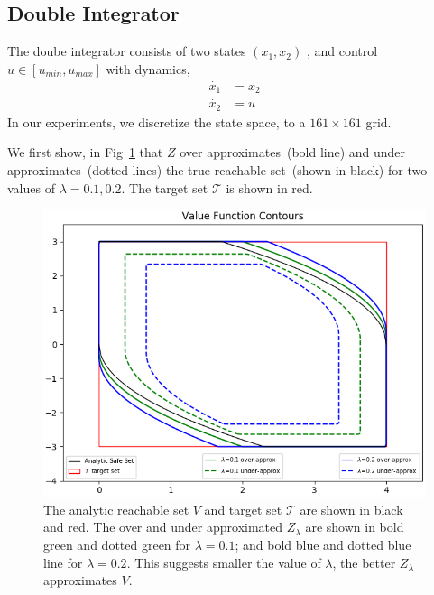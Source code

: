 \subsection{Double Integrator}
The doube integrator consists of two states $(x_1, x_2)$ , and  control $u \in [u_{min}, u_{max}]$ with dynamics,
\begin{equation}
\begin{split}
\dot{x_1} & = x_2 \\
\dot{x_2} & = u 
\end{split}
\end{equation}
In our experiments, we discretize the state space, to a $161 \times 161$ grid.

We first show, in Fig~\ref{fig:convergence} that $Z$ over approximates~(bold line) and under approximates~(dotted lines) the true reachable set~(shown in black) for two values of $\lambda = 0.1, 0.2$. The target set $\mathcal{T}$ is shown in red. 
\begin{figure}
\includegraphics[scale=0.5]{convergence_difflambda.png}
\caption{The analytic reachable set $V$ and target set $\mathcal{T}$ are shown in black and red. The over and under approximated $Z_{\lambda}$ are shown in bold green and dotted green for $\lambda=0.1$; and bold blue and dotted blue line for $\lambda  = 0.2$. This suggests smaller the value of $\lambda$, the better $Z_{\lambda}$ approximates $V$.}
\label{fig:convergence}
\end{figure}

